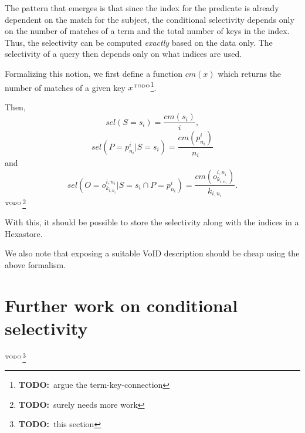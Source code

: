 \documentclass[12pt, draft]{article}
\newcommand{\todo}[1]{\ensuremath{^{\textrm{\tiny{TODO}\normalsize}}}\footnote{\textbf{TODO:}~#1}}
\begin{document}
The pattern that emerges is that since the index for the predicate is
already dependent on the match for the subject, the conditional
selectivity depends only on the number of matches of a term and the
total number of keys in the index. Thus, the selectivity can be
computed \emph{exactly} based on the data only. The selectivity of a
query then depends only on what indices are used. 

Formalizing this notion, we first define a function $cm(x)$ which
returns the number of matches of a given key $x$\todo{argue the
  term-key-connection}. 

Then, 
\begin{equation}
sel(S = s_i) = \frac{cm(s_i)}{i} ,
\end{equation}
\begin{equation}
sel(P = p_{n_i}^i|S = s_i) = \frac{cm(p_{n_i}^i)}{n_i}
\end{equation}
and
\begin{equation}
sel(O = o_{k_{i,n_i}}^{i,n_i} |S = s_i \cap P = p_{n_i}^i) =
\frac{cm(o_{k_{i,n_i}}^{i,n_i})}{k_{i,n_i}} .
\end{equation}
\todo{surely needs more work}

With this, it should be possible to store the selectivity along with
the indices in a Hexastore.

We also note that exposing a suitable VoID description should be cheap
using the above formalism.

\section{Further work on conditional selectivity}

\todo{this section}



\end{document}
